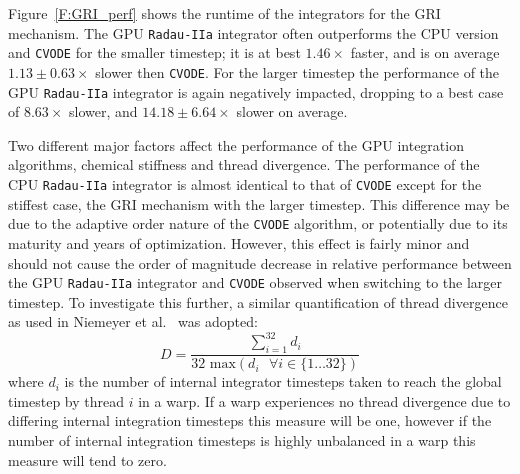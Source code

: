 \documentclass[preprint]{elsarticle}
\begin{document}
Figure~\ref{F:GRI_perf} shows the runtime of the integrators for the GRI mechanism.
The GPU \texttt{Radau-IIa} integrator often outperforms the CPU version and \texttt{CVODE} for the smaller timestep; it is at best $1.46\times$ faster, and is on average $1.13\pm0.63\times$ slower then \texttt{CVODE}.
For the larger timestep the performance of the GPU \texttt{Radau-IIa} integrator is again negatively impacted, dropping to a best case of $8.63\times$ slower, and $14.18\pm6.64\times$ slower on average.

Two different major factors affect the performance of the GPU integration algorithms, chemical stiffness and thread divergence.
The performance of the CPU \texttt{Radau-IIa} integrator is almost identical to that of \texttt{CVODE} except for the stiffest case, the GRI mechanism with the larger timestep.
This difference may be due to the adaptive order nature of the \texttt{CVODE} algorithm, or potentially due to its maturity and years of optimization.
However, this effect is fairly minor and should not cause the order of magnitude decrease in relative performance between the GPU \texttt{Radau-IIa} integrator and \texttt{CVODE} observed when switching to the larger timestep.
To investigate this further, a similar quantification of thread divergence as used in Niemeyer et al.~\cite{Niemeyer:2014aa} was adopted:
\begin{equation}
  D = \frac{\sum_{i=1}^{32}{d_i}}{32\text{ max}\left(d_i\text{ }\forall i \in \lbrace 1 \ldots 32 \rbrace \right)}
\end{equation}
where $d_i$ is the number of internal integrator timesteps taken to reach the global timestep by thread $i$ in a warp.
If a warp experiences no thread divergence due to differing internal integration timesteps this measure will be one, however if the number of internal integration timesteps is highly unbalanced in a warp this measure will tend to zero.
\end{document}
